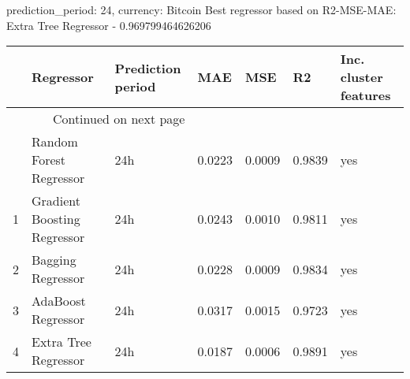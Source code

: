 
prediction_period: 24, currency: Bitcoin
Best regressor based on R2-MSE-MAE: Extra Tree Regressor - 0.969799464626206
\begin{longtable}{lllllll}
\toprule
{} &                    Regressor & Prediction period &     MAE &     MSE &      R2 & Inc. cluster features \\
\midrule
\endhead
\midrule
\multicolumn{3}{r}{{Continued on next page}} \\
\midrule
\endfoot

\bottomrule
\endlastfoot
0 &      Random Forest Regressor &               24h &  0.0223 &  0.0009 &  0.9839 &                   yes \\
1 &  Gradient Boosting Regressor &               24h &  0.0243 &  0.0010 &  0.9811 &                   yes \\
2 &            Bagging Regressor &               24h &  0.0228 &  0.0009 &  0.9834 &                   yes \\
3 &           AdaBoost Regressor &               24h &  0.0317 &  0.0015 &  0.9723 &                   yes \\
4 &         Extra Tree Regressor &               24h &  0.0187 &  0.0006 &  0.9891 &                   yes \\
\end{longtable}
